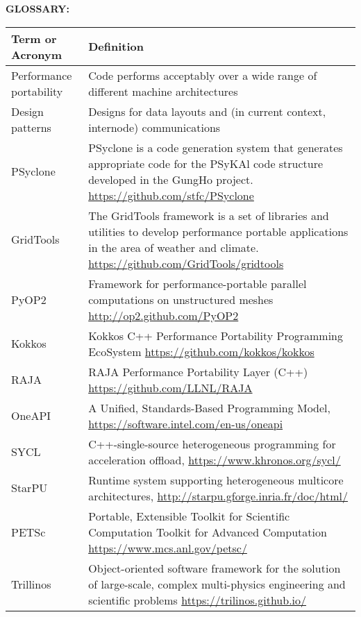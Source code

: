 \begin{table}[h]
\textbf{\textsf{GLOSSARY:}}
\begin{center}
\begin{tabular}{|p{4.0cm}|p{12.0cm}|}
\hline
\textbf{\textsf{Term or Acronym}}
& \textbf{\textsf{Definition}} \\
\hline
Performance portability & Code performs acceptably over a wide
range of different machine architectures \\ \hline
Design patterns &  Designs for data layouts and (in current context, internode) communications
\\ \hline
PSyclone & PSyclone is a code generation system that generates appropriate code 
for the PSyKAl code structure developed in the GungHo project.\linebreak{}
\url{https://github.com/stfc/PSyclone}\\
\hline
GridTools & The GridTools framework is a set of libraries and utilities to develop 
performance portable applications in the area of weather and climate.\linebreak{}
\url{https://github.com/GridTools/gridtools}\\
\hline
PyOP2 & Framework for performance-portable parallel computations on unstructured 
meshes \url{http://op2.github.com/PyOP2}\\
\hline
Kokkos & Kokkos C++ Performance Portability Programming EcoSystem\linebreak{}
\url{https://github.com/kokkos/kokkos}\\
\hline
RAJA & RAJA Performance Portability Layer (C++)\linebreak{}
\url{https://github.com/LLNL/RAJA}\\
\hline
OneAPI & A Unified, Standards-Based Programming Model, \url{https://software.intel.com/en-us/oneapi}\\
SYCL & C++-single-source heterogeneous programming for acceleration offload,
\url{https://www.khronos.org/sycl/}\\
\hline
StarPU & Runtime system supporting heterogeneous multicore architectures,
\url{http://starpu.gforge.inria.fr/doc/html/}\\
\hline
PETSc & Portable, Extensible Toolkit for Scientific Computation Toolkit for Advanced 
Computation \url{https://www.mcs.anl.gov/petsc/}\\
\hline
Trillinos & Object-oriented software framework for the solution of large-scale, 
complex multi-physics engineering and scientific problems\linebreak{}
\url{https://trilinos.github.io/}\\
\hline
\end{tabular}
\end{center}
\end{table}




